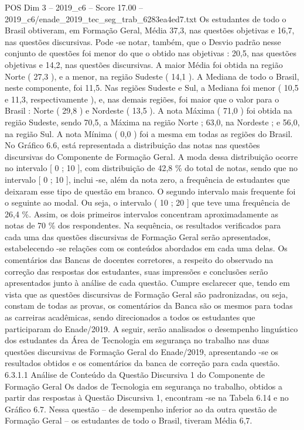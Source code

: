 \begin{textsample}{POS Dim 3 – 2019\_c6 – Score 17.00 – 2019\_c6/enade\_2019\_tec\_seg\_trab\_6283ea4ed7.txt}
Os estudantes de todo o Brasil obtiveram, em Formação Geral, Média 37,3, nas questões objetivas e 16,7, nas questões discursivas.
Pode -se notar, também, que o Desvio padrão nesse conjunto de questões foi menor do que o obtido nas objetivas : 20,5, nas questões objetivas e 14,2, nas questões discursivas.
A maior Média foi obtida na região Norte ( 27,3 ), e a menor, na região Sudeste ( 14,1 ).
A Mediana de todo o Brasil, neste componente, foi 11,5.
Nas regiões Sudeste e Sul, a Mediana foi menor ( 10,5 e 11,3, respectivamente ), e, nas demais regiões, foi maior que o valor para o Brasil : Norte ( 29,8 ) e Nordeste ( 13,5 ).
A nota Máxima ( 71,0 ) foi obtida na região Sudeste, sendo 70,5, a Máxima na região Norte ; 63,0, na Nordeste ; e 56,0, na região Sul.
A nota Mínima ( 0,0 ) foi a mesma em todas as regiões do Brasil.
No Gráfico 6.6, está representada a distribuição das notas nas questões discursivas do Componente de Formação Geral.
A moda dessa distribuição ocorre no intervalo [ 0 ; 10 ], com distribuição de 42,8 \% do total de notas, sendo que no intervalo [ 0 ; 10 ], inclui -se, além da nota zero, a frequência de estudantes que deixaram esse tipo de questão em branco.
O segundo intervalo mais frequente foi o seguinte ao modal.
Ou seja, o intervalo ( 10 ; 20 ] que teve uma frequência de 26,4 \%.
Assim, os dois primeiros intervalos concentram aproximadamente as notas de 70 \% dos respondentes.
Na sequência, os resultados verificados para cada uma das questões discursivas de Formação Geral serão apresentados, estabelecendo -se relações com os conteúdos abordados em cada uma delas.
Os comentários das Bancas de docentes corretores, a respeito do observado na correção das respostas dos estudantes, suas impressões e conclusões serão apresentados junto à análise de cada questão.
Cumpre esclarecer que, tendo em vista que as questões discursivas de Formação Geral são padronizadas, ou seja, constam de todas as provas, os comentários da Banca são os mesmos para todas as carreiras acadêmicas, sendo direcionados a todos os estudantes que participaram do Enade/2019.
A seguir, serão analisados o desempenho linguístico dos estudantes da Área de Tecnologia em segurança no trabalho nas duas questões discursivas de Formação Geral do Enade/2019, apresentando -se os resultados obtidos e os comentários da banca de correção para cada questão. 6.3.1.1 Análise de Conteúdo da Questão Discursiva 1 do Componente de Formação Geral Os dados de Tecnologia em segurança no trabalho, obtidos a partir das respostas à Questão Discursiva 1, encontram -se na Tabela 6.14 e no Gráfico 6.7.
Nessa questão – de desempenho inferior ao da outra questão de Formação Geral – os estudantes de todo o Brasil, tiveram Média 6,7.

\end{textsample}
